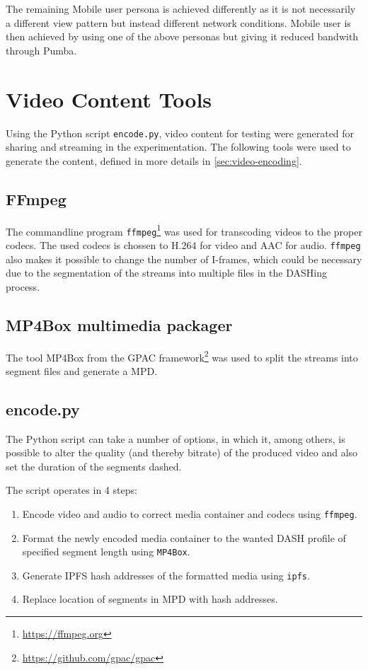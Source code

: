 The remaining Mobile user persona is achieved differently as it is not necessarily a different view pattern but instead different network conditions. Mobile user is then achieved by using one of the above personas but giving it reduced bandwith through Pumba.

\section{Video Content Tools}
Using the Python script \texttt{encode.py}, video content for testing were generated for sharing and streaming in the experimentation. The following tools were used to generate the content, defined in more details in \autoref{sec:video-encoding}.

\subsection{FFmpeg}
The commandline program \texttt{ffmpeg}\footnote{\url{https://ffmpeg.org}} was used for transcoding videos to the proper codecs. The used codecs is chossen to H.264 for video and AAC for audio. 
\texttt{ffmpeg} also makes it possible to change the number of I-frames, which could be necessary due to the segmentation of the streams into multiple files in the DASHing process.

\subsection{MP4Box multimedia packager}
The tool MP4Box from the GPAC framework\footnote{\url{https://github.com/gpac/gpac}} was used to split the streams into segment files and generate a \acs{MPD}.

\subsection{encode.py}
The Python script can take a number of options, in which it, among others, is possible to alter the quality (and thereby bitrate) of the produced video and also set the duration of the segments dashed.

The script operates in 4 steps:
\begin{enumerate}
    \item Encode video and audio to correct media container and codecs using \texttt{ffmpeg}.
    \item Format the newly encoded media container to the wanted DASH profile of specified segment length using \texttt{MP4Box}.
    \item Generate \acs{IPFS} hash addresses of the formatted media using \texttt{ipfs}.
    \item Replace location of segments in \acs{MPD} with hash addresses.
\end{enumerate}

